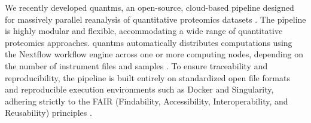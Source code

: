\documentclass[12pt]{article}
\begin{document}


We recently developed quantms, an open-source, cloud-based pipeline designed for massively parallel reanalysis of quantitative proteomics datasets \cite{dai_quantms_2024}. The pipeline is highly modular and flexible, accommodating a wide range of quantitative proteomics approaches. quantms automatically distributes computations using the Nextflow workflow engine across one or more computing nodes, depending on the number of instrument files and samples \cite{di_tommaso_nextflow_2017}. To ensure traceability and reproducibility, the pipeline is built entirely on standardized open file formats \cite{dai_proteomics_2021} \cite{martens_mzmlcommunity_2011} and reproducible execution environments such as Docker and Singularity, adhering strictly to the FAIR (Findability, Accessibility, Interoperability, and Reusability) principles \cite{wilkinson_fair_2016}. %
\end{document}
